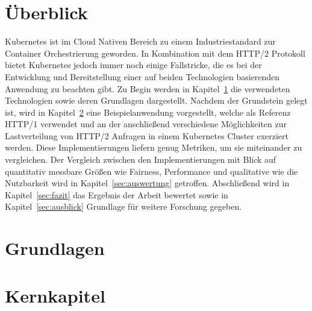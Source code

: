 \documentclass[a4paper,12pt]{article}
\begin{document}

    \frontmatter

    \tableofcontents

    \newpage

    \section*{Überblick}
    Kubernetes ist im Cloud Nativen Bereich zu einem Industriestandard zur Container Orchestrierung geworden.
    In Kombination mit dem HTTP/2 Protokoll bietet Kubernetes jedoch immer noch einige Fallstricke, die es bei der Entwicklung und Bereitstellung einer auf beiden Technologien basierenden Anwendung zu beachten gibt.
    Zu Begin werden in Kapitel~\ref{sec:grundlagen} die verwendeten Technologien sowie deren Grundlagen dargestellt.
    Nachdem der Grundstein gelegt ist, wird in Kapitel~\ref{sec:kernkapitel} eine Beispielanwendung vorgestellt, welche als Referenz HTTP/1 verwendet und an der anschließend verschiedene Möglichkeiten zur Lastverteilung von HTTP/2 Anfragen in einem Kubernetes Cluster exerziert werden.
    Diese Implementierungen liefern genug Metriken, um sie miteinander zu vergleichen.
    Der Vergleich zwischen den Implementierungen mit Blick auf quantitativ messbare Größen wie Fairness, Performance und qualitative wie die Nutzbarkeit wird in Kapitel~\ref{sec:auswertung} getroffen.
    Abschließend wird in Kapitel~\ref{sec:fazit} das Ergebnis der Arbeit bewertet sowie in Kapitel~\ref{sec:ausblick} Grundlage für weitere Forschung gegeben.
    \newpage

    \mainmatter

    \section{Grundlagen}\label{sec:grundlagen}
    

    \section{Kernkapitel}\label{sec:kernkapitel}
    
\end{document}
